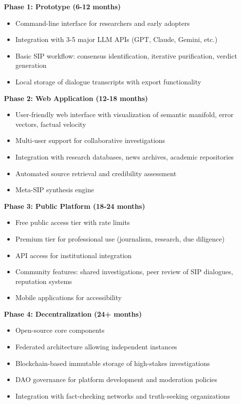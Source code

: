 \documentclass[11pt,a4paper]{article}
\begin{document}
\begin{small}
\textbf{Phase 1: Prototype (6-12 months)}
\begin{itemize}[nosep]
    \item Command-line interface for researchers and early adopters
    \item Integration with 3-5 major LLM APIs (GPT, Claude, Gemini, etc.)
    \item Basic SIP workflow: consensus identification, iterative purification, verdict generation
    \item Local storage of dialogue transcripts with export functionality
\end{itemize}

\textbf{Phase 2: Web Application (12-18 months)}
\begin{itemize}[nosep]
    \item User-friendly web interface with visualization of semantic manifold, error vectors, factual velocity
    \item Multi-user support for collaborative investigations
    \item Integration with research databases, news archives, academic repositories
    \item Automated source retrieval and credibility assessment
    \item Meta-SIP synthesis engine
\end{itemize}

\textbf{Phase 3: Public Platform (18-24 months)}
\begin{itemize}[nosep]
    \item Free public access tier with rate limits
    \item Premium tier for professional use (journalism, research, due diligence)
    \item API access for institutional integration
    \item Community features: shared investigations, peer review of SIP dialogues, reputation systems
    \item Mobile applications for accessibility
\end{itemize}

\textbf{Phase 4: Decentralization (24+ months)}
\begin{itemize}[nosep]
    \item Open-source core components
    \item Federated architecture allowing independent instances
    \item Blockchain-based immutable storage of high-stakes investigations
    \item DAO governance for platform development and moderation policies
    \item Integration with fact-checking networks and truth-seeking organizations
\end{itemize}


\end{small}
\end{document}
